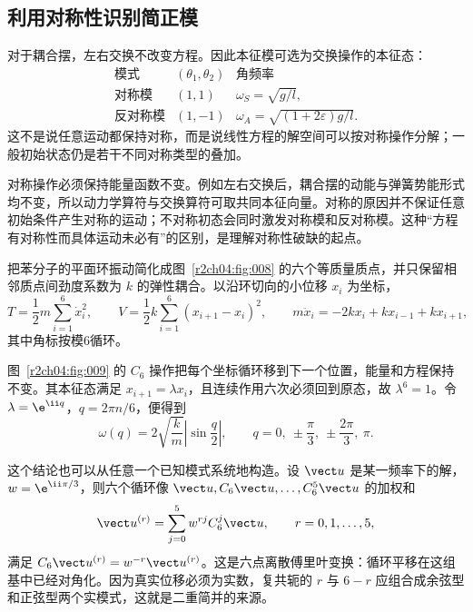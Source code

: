 \subsection{利用对称性识别简正模}

对于耦合摆，左右交换不改变方程。因此本征模可选为交换操作的本征态：
\begin{equation}
 \begin{array}{c|c|c}
 \text{模式}&(\theta_1,\theta_2)&\text{角频率}\\ \hline
 \text{对称模}&(1,1)&\omega_S=\sqrt{g/l},\\
 \text{反对称模}&(1,-1)&\omega_A=\sqrt{(1+2\varepsilon)g/l}.
 \end{array}
 \label{r2ch04:eq:026}
\end{equation}
这不是说任意运动都保持对称，而是说线性方程的解空间可以按对称操作分解；一般初始状态仍是若干不同对称类型的叠加。

对称操作必须保持能量函数不变。例如左右交换后，耦合摆的动能与弹簧势能形式均不变，所以动力学算符与交换算符可取共同本征向量。对称的原因并不保证任意初始条件产生对称的运动；不对称初态会同时激发对称模和反对称模。这种“方程有对称性而具体运动未必有”的区别，是理解对称性破缺的起点。

把苯分子的平面环振动简化成图~\ref{r2ch04:fig:008} 的六个等质量质点，并只保留相邻质点间劲度系数为 $k$ 的弹性耦合。以沿环切向的小位移 $x_i$ 为坐标，
\begin{equation}
 T=\frac12m\sum_{i=1}^6\dot x_i^2,\qquad
 V=\frac12k\sum_{i=1}^6(x_{i+1}-x_i)^2,\qquad
 m\ddot x_i=-2kx_i+kx_{i-1}+kx_{i+1},
 \label{r2ch04:eq:027}
\end{equation}
其中角标按模6循环。
\figBenzeneModel

图~\ref{r2ch04:fig:009} 的 $C_6$ 操作把每个坐标循环移到下一个位置，能量和方程保持不变。其本征态满足 $x_{i+1}=\lambda x_i$，且连续作用六次必须回到原态，故 $\lambda^6=1$。令 $\lambda=\e^{\ii q}$，$q=2\pi n/6$，便得到
\begin{equation}
 \omega(q)=2\sqrt{\frac km}\left|\sin\frac q2\right|,\qquad
 q=0,\ \pm\frac\pi3,\ \pm\frac{2\pi}3,\ \pi.
 \label{r2ch04:eq:028}
\end{equation}
\figCyclicSymmetry

这个结论也可以从任意一个已知模式系统地构造。设 $\vect u$ 是某一频率下的解，$w=\e^{\ii\pi/3}$，则六个循环像
$\vect u,C_6\vect u,\ldots,C_6^5\vect u$ 的加权和
\[
 \vect u^{(r)}=\sum_{j=0}^{5}w^{rj}C_6^j\vect u,
 \qquad r=0,1,\ldots,5,
\]
满足 $C_6\vect u^{(r)}=w^{-r}\vect u^{(r)}$。这是六点离散傅里叶变换：循环平移在这组基中已经对角化。因为真实位移必须为实数，复共轭的 $r$ 与 $6-r$ 应组合成余弦型和正弦型两个实模式，这就是二重简并的来源。

